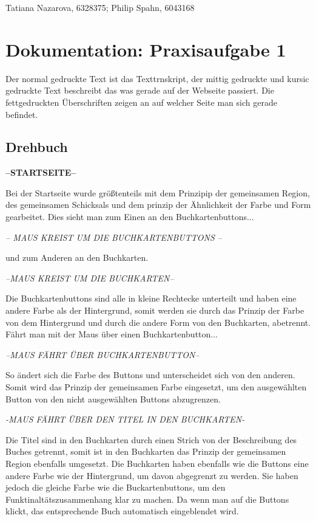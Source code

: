 \documentclass{article}
\begin{document}
Tatiana Nazarova, 6328375; Philip Spahn, 6043168
\section*{Dokumentation: Praxisaufgabe 1}
Der normal gedruckte Text ist das Texttrnskript, der mittig gedruckte und kursic gedruckte Text beschreibt das was gerade auf der Webseite passiert. Die fettgedruckten Überschriften zeigen an auf welcher Seite man sich gerade befindet.

\subsection*{Drehbuch}
\begin{center}
\textbf{--STARTSEITE--}
\end{center}
Bei der Startseite wurde größtenteils mit dem Prinzipip der gemeinsamen Region, des gemeinsamen Schicksals und dem prinzip der Ähnlichkeit der Farbe und Form gearbeitet. Dies sieht man zum Einen an den Buchkartenbuttons...
\begin{center}
\textit{-- MAUS KREIST UM DIE BUCHKARTENBUTTONS --}
\end{center}
und zum Anderen an den Buchkarten.
\begin{center}
\textit{--MAUS KREIST UM DIE BUCHKARTEN--}
\end{center}
Die Buchkartenbuttons sind alle in kleine Rechtecke unterteilt und haben eine andere Farbe als der Hintergrund, somit werden sie durch das Prinzip der Farbe von dem Hintergrund und durch die andere Form von den Buchkarten, abetrennt. Fährt man mit der Maus über einen Buchkartenbutton...
\begin{center}
\textit{--MAUS FÄHRT ÜBER BUCHKARTENBUTTON--}
\end{center}
So ändert sich die Farbe des Buttons und unterscheidet sich von den anderen. Somit wird das Prinzip der gemeinsamen Farbe eingesetzt, um den ausgewählten Button von den nicht ausgewählten Buttons abzugrenzen.\\
\begin{center}
\textit{-MAUS FÄHRT ÜBER DEN TITEL IN DEN BUCHKARTEN-}
\end{center}
Die Titel sind in den Buchkarten durch einen Strich von der Beschreibung des Buches getrennt, somit ist in den Buchkarten das Prinzip der gemeinsamen Region ebenfalls umgesetzt. Die Buchkarten haben ebenfalls wie die Buttons eine andere Farbe wie der Hintergrund, um davon abgegrenzt zu werden. Sie haben jedoch die gleiche Farbe wie die Buckartenbuttons, um den Funktinaltätszusammenhang klar zu machen. Da wenn man auf die Buttons klickt, das entsprechende Buch automatisch eingeblendet wird.
\end{document}
